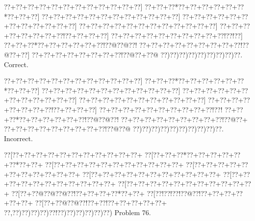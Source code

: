 \documentclass[a5paper]{article}
\begin{document}
\begin{center}
{\goo
\0??+\0??+\0??+\0??+\0??+\0??+\0??+\0??+\0??+\0??+\0??+\0??]
\0??+\0??+\0??*\0??+\0??+\0??+\0??+\0??+\0??*\0??+\0??+\0??]
\0??+\0??+\0??+\0??+\0??+\0??+\0??+\0??+\0??+\0??+\0??+\0??]
\0??+\0??+\0??+\0??+\0??+\0??+\0??+\0??+\0??+\0??+\0??+\0??]
\0??+\0??+\0??+\0??+\0??+\0??+\0??+\0??+\0??+\0??+\0??+\0??]
\0??+\0??+\0??+\0??+\0??+\0??+\0??+\0??!\0??+\0??+\0??+\0??]
\0??+\0??+\0??+\0??+\0??+\0??+\0??+\0??+\0??+\0??!\0??!\0??]
\0??+\0??+\0??*\0??+\0??+\0??+\0??+\0??+\0??!\0??@\0??@\0??!
\0??+\0??+\0??+\0??+\0??+\0??+\0??+\0??+\0??!\0??@\0??+\0??]
\0??+\0??+\0??+\0??+\0??+\0??+\0??+\0??!\0??@\0??+\0??@
\0??)\0??)\0??)\0??)\0??)\0??)\0??)\0??)\0??.
}
Correct. 

\end{center}
\begin{center}
{\goo
\0??+\0??+\0??+\0??+\0??+\0??+\0??+\0??+\0??+\0??+\0??+\0??]
\0??+\0??+\0??*\0??+\0??+\0??+\0??+\0??+\0??*\0??+\0??+\0??]
\0??+\0??+\0??+\0??+\0??+\0??+\0??+\0??+\0??+\0??+\0??+\0??]
\0??+\0??+\0??+\0??+\0??+\0??+\0??+\0??+\0??+\0??+\0??+\0??]
\0??+\0??+\0??+\0??+\0??+\0??+\0??+\0??+\0??+\0??+\0??]
\0??+\0??+\0??+\0??+\0??+\0??+\0??+\0??!\0??+\0??+\0??+\0??]
\0??+\0??+\0??+\0??+\0??+\0??+\0??+\0??+\0??+\0??!\0??!
\0??+\0??+\0??*\0??+\0??+\0??+\0??+\0??+\0??!\0??@\0??@\0??!
\0??+\0??+\0??+\0??+\0??+\0??+\0??+\0??+\0??!\0??@\0??+
\0??+\0??+\0??+\0??+\0??+\0??+\0??+\0??+\0??!\0??@\0??@
\0??)\0??)\0??)\0??)\0??)\0??)\0??)\0??)\0??)\0??.
}
Incorrect. 

\end{center}
\newpage
\begin{center}
{\goo
\0??[\0??+\0??+\0??+\0??+\0??+\0??+\0??+\0??+\0??+\0??+\0??+
\0??[\0??+\0??+\0??*\0??+\0??+\0??+\0??+\0??+\0??*\0??+\0??+
\0??[\0??+\0??+\0??+\0??+\0??+\0??+\0??+\0??+\0??+\0??+\0??+
\0??[\0??+\0??+\0??+\0??+\0??+\0??+\0??+\0??+\0??+\0??+\0??+
\0??[\0??+\0??+\0??+\0??+\0??+\0??+\0??+\0??+\0??+\0??+\0??+
\0??[\0??+\0??+\0??+\0??+\0??+\0??+\0??+\0??+\0??+\0??+\0??+
\0??[\0??+\0??+\0??+\0??+\0??+\0??+\0??+\0??+\0??+\0??+\0??+
\0??[\0??+\0??@\0??@\0??@\0??!\0??+\0??+\0??+\0??*\0??+\0??+
\0??[\0??!\0??!\0??!\0??@\0??!\0??+\0??+\0??+\0??+\0??+\0??+
\0??[\0??+\0??@\0??@\0??!\0??+\0??!\0??+\0??+\0??+\0??+\0??+
\0??,\0??)\0??)\0??)\0??)\0??!\0??)\0??)\0??)\0??)\0??)\0??)
}
Problem 76.

\end{center}
\end{document}
